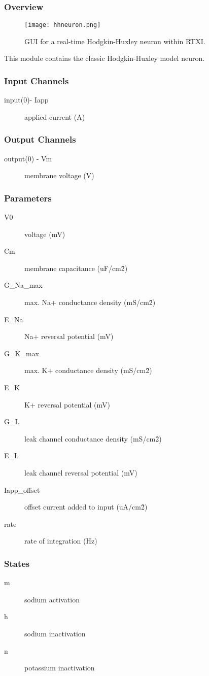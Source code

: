 \subsubsection{Overview}
\label{Hodgkin-Huxley Neuron}
\begin{figure}[h]
\begin{center}
\texttt{[image: hhneuron.png]} 
\caption[HH Neuron]{GUI for a real-time Hodgkin-Huxley neuron within RTXI.} 
\end{center}
\label{hhneuron}
\end{figure}

This module contains the classic Hodgkin-Huxley model neuron. 

\subsubsection{Input Channels}
\begin{description}
\item[input(0)- Iapp] applied current (A)
\end{description}

\subsubsection{Output Channels}
\begin{description}
\item[output(0) - Vm] membrane voltage (V)
\end{description}

\subsubsection{Parameters}
\begin{description}
\item[V0] voltage (mV)
\item[Cm] membrane capacitance (uF/cm\^2)
\item[G\_Na\_max] max. Na+ conductance density  (mS/cm\^2)
\item[E\_Na] Na+ reversal potential (mV)
\item[G\_K\_max] max. K+ conductance density (mS/cm\^2)
\item[E\_K] K+ reversal potential (mV)
\item[G\_L] leak channel conductance density (mS/cm\^2)
\item[E\_L] leak channel reversal potential (mV)
\item[Iapp\_offset] offset current added to input (uA/cm\^2)
\item[rate] rate of integration (Hz)
\end{description}

\subsubsection{States}
\begin{description}
\item[m] sodium activation
\item[h] sodium inactivation
\item[n] potassium inactivation
\end{description}